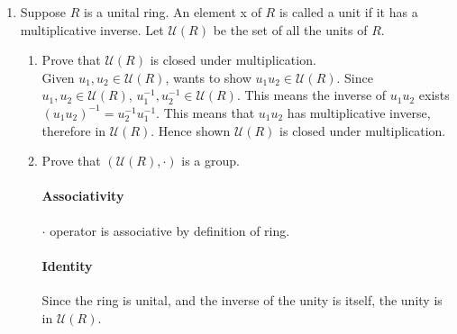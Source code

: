 \documentclass[12pt]{article}
\begin{document}
\begin{enumerate}
\begin{proof}
			$(<=)$: Assume $R_1, \dots, R_n$ are unital, wants to show $R_1 \times,
			\dots, \times R_n$ is unital. By assumption, $\exists\ \mathds{1}_1 \dots
			\mathds{1}_n$, unity for each ring $R_1, \dots, R_n$. Wants to show
			$(\mathds{1}_1 \dots \mathds{1}_n)$ is the unity of $R_1 \times, \dots,
			\times R_n$.
			\begin{align*}
				(\mathds{1}_1, \dots, \mathds{1}_n) \cdot (r_1, \dots, r_n)
				&=(\mathds{1}_1 \cdot r_1, \dots, \mathds{1}_n \cdot r_n) \\
				&=(r_1, \dots, r_n)\forall r_i \in R_i,\ i\in \mathbb{Z},\ 1 \le i \le n
			\end{align*}
			\begin{align*}
				(r_1, \dots, r_n) \cdot (\mathds{1}_1, \dots, \mathds{1}_n)
				&=(r_1 \cdot \mathds{1}_1 , \dots, r_n \cdot \mathds{1}_n) \\
				&=(r_1, \dots, r_n)\forall r_i \in R_i,\ i\in \mathbb{Z},\ 1 \le i \le n
			\end{align*}
		Hence shown $(\mathds{1}_1, \dots, \mathds{1}_n)$ is the unity of $R_1 \times, \dots,
			\times R_n$.
		\end{proof}

	\item Suppose $R$ is a unital ring. An element x of $R$ is called a unit if it
		has a multiplicative inverse. Let $\mathcal{U}(R)$ be the set of all the
		units of $R$.
		\begin{enumerate}
			\item Prove that $\mathcal{U}(R)$ is closed under multiplication.\\
				Given $u_1, u_2 \in \mathcal{U}(R)$, wants to show $u_1u_2 \in
				\mathcal{U}(R)$. Since $u_1, u_2 \in \mathcal{U}(R)$, $u_1^{-1},
				u_2^{-1} \in \mathcal{U}(R)$. This means the inverse of $u_1u_2$ exists
				$(u_1u_2)^{-1} = u_2^{-1}u_1^{-1}$. This means that $u_1u_2$ has
				multiplicative inverse, therefore in $\mathcal{U}(R)$. Hence shown
				$\mathcal{U}(R)$ is closed under multiplication.

			\item Prove that $(\mathcal{U}(R), \cdot)$ is a group.
				\paragraph{Associativity}$\cdot$ operator is associative by definition
				of ring.
				\paragraph{Identity}Since the ring is unital, and the inverse of the
				unity is itself, the unity is in $\mathcal{U}(R)$.

\end{enumerate}
\end{enumerate}
\end{document}
